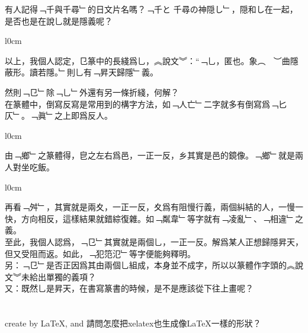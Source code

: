 \documentclass[a4paper]{article}
\begin{document}
\begin{huge}
有人記得﹁千與千尋﹂的日文片名嗎？﹁千と 千尋の神隠し﹂，隠和し在一起，是否也是在說乚就是隱義呢？
\\

\begin{wrapfigure}{l}{0cm}
\end{wrapfigure}
以上，我個人認定，㔾篆中的長綫爲乚，︽說文︾：“﹁乚，匿也。象︵
𨒅
\rmfamily
︶曲隱蔽形。讀若隱。﹂則乚有﹁昇天歸隱﹂義。

然則﹁㔾﹂除﹁乚﹂外還有另一條折綫，何解？
\\

在篆體中，倒寫反寫是常用到的構字方法，如﹁人亡﹂二字就多有倒寫爲﹁匕仄﹂。﹁眞﹂之上即爲反人。

\begin{wrapfigure}{l}{0cm}
\end{wrapfigure}
由﹁鄉﹂之篆體得，皀之左右爲邑，一正一反，乡其實是邑的鏡像。﹁鄉﹂就是兩人對坐吃飯。

\begin{wrapfigure}{l}{0cm}
\end{wrapfigure}
再看﹁舛﹂，其實就是兩夊，一正一反，夊爲有阻慢行義，兩個糾結的人，一慢一快，方向相反，這樣結果就錯綜復雜。如﹁粼韋﹂等字就有﹁凌亂﹂、﹁相違﹂之義。
\\

至此，我個人認爲，﹁㔾﹂其實就是兩個乚，一正一反。解爲某人正想歸隱昇天，但又受阻而返。如此，﹁犯笵氾﹂等字便能夠釋明。
\\

另：﹁㔾﹂是否正因爲其由兩個乚組成，本身並不成字，所以以篆體作字頭的︽說文︾未給出單獨的義項？
\\

又：既然乚是昇天，在書寫篆書的時候，是不是應該從下往上畫呢？
\\
\\
\\

create by \LaTeX , and 請問怎麼把xelatex也生成像\LaTeX 一樣的形狀？

\end{huge}
\end{document}
